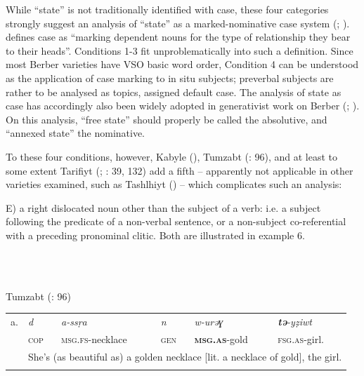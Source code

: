 \documentclass[output=paper]{langscibook}
\begin{document}
\begin{styleStandarduser}
While “state” is not traditionally identified with case, these four categories strongly suggest an analysis of “state” as a marked-nominative case system (\citealt{König2008}; \citealt{Sasse1984}). \citet[1]{Blake1994} defines case as “marking dependent nouns for the type of relationship they bear to their heads”. Conditions 1-3 fit unproblematically into such a definition. Since most Berber varieties have VSO basic word order, Condition 4 can be understood as the application of case marking to in situ subjects; preverbal subjects are rather to be analysed as topics, assigned default case. The analysis of state as case has accordingly also been widely adopted in generativist work on Berber (\citealt{Guerssel1992}; \citealt{Felice2020}). On this analysis, “free state” should properly be called the absolutive, and “annexed state” the nominative.
\end{styleStandarduser}

\begin{styleStandarduser}
To these four conditions, however, Kabyle (\citealt{MettouchiFrajzyngier2013}), Tumzabt (\citealt{AbdessalamAbdessalam1996}: 96), and at least to some extent Tarifiyt (\citealt{Lafkioui2000}; \citealt{MourighKossmann2020}: 39, 132) add a fifth – apparently not applicable in other varieties examined, such as Tashlhiyt (\citealt{MettouchiFleisch2010}) – which complicates such an analysis:
\end{styleStandarduser}

\begin{styleStandarduser}
E) a right dislocated noun other than the subject of a verb: i.e. a subject following the predicate of a non-verbal sentence, or a non-subject co-referential with a preceding pronominal clitic. Both are illustrated in example 6.
\end{styleStandarduser}

\begin{styleStandarduser}
\ea%
    \label{ex:key:6}
    \gll \\
         \\
    \glt
    \z %

          Tumzabt (\citealt{AbdessalamAbdessalam1996}: 96)
\end{styleStandarduser}


\begin{tabularx}{\textwidth}{XXXXXX}

\lsptoprule
a. & \textit{d} & \textit{a-ssṛa} & \textit{n} & \textit{w-urəɣ} & \textbf{\textit{tə}}\textit{{}-yẓiwt}\\
& \textsc{cop} & \textsc{msg.fs}{}-necklace & \textsc{gen} & \textbf{\textsc{msg.as}}{}-gold & \textsc{fsg.as}{}-girl.\\
& \multicolumn{5}{c}{She’s (as beautiful as) a golden necklace [lit. a necklace of gold], the girl.}\\
\lspbottomrule
\end{tabularx}
\end{document}
